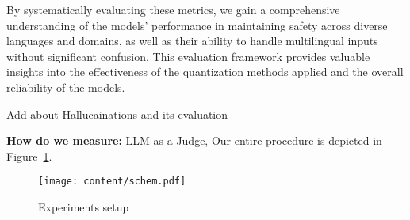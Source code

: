 By systematically evaluating these metrics, we gain a comprehensive understanding of the models' performance in maintaining safety across diverse languages and domains, as well as their ability to handle multilingual inputs without significant confusion. This evaluation framework provides valuable insights into the effectiveness of the quantization methods applied and the overall reliability of the models.

Add about Hallucainations and its evaluation

\textbf{How do we measure:} LLM as a Judge,  Our entire procedure is depicted in Figure~\ref{fig:scheme}.



\begin{figure}[h] 
    \centering
    \texttt{[image: content/schem.pdf]} 
    \caption{Experiments setup} 
    \label{fig:scheme} 
\end{figure}


